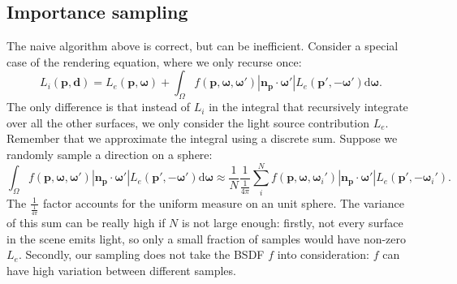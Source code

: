\documentclass{article}
\begin{document}
\subsection{Importance sampling}
The naive algorithm above is correct, but can be inefficient. Consider a special case of the rendering equation, where we only recurse once:
\begin{equation}
    L_i(\mathbf{p}, \mathbf{d}) = L_e(\mathbf{p}, \mathbf{\omega}) + \int_{\Omega} f(\mathbf{p}, \mathbf{\omega}, \mathbf{\omega}') |\mathbf{n}_{\mathbf{p}} \cdot \mathbf{\omega}'| L_e(\mathbf{p}', -\mathbf{\omega}') \mathrm{d} \mathbf{\omega}.
\end{equation}
The only difference is that instead of $L_i$ in the integral that recursively integrate over all the other surfaces, we only consider the light source contribution $L_e$. Remember that we approximate the integral using a discrete sum. Suppose we randomly sample a direction on a sphere:
\begin{equation}
  \int_{\Omega} f(\mathbf{p}, \mathbf{\omega}, \mathbf{\omega}') |\mathbf{n}_{\mathbf{p}} \cdot \mathbf{\omega}'| L_e(\mathbf{p}', -\mathbf{\omega}') \mathrm{d} \mathbf{\omega} \approx \frac{1}{N} \frac{1}{\frac{1}{4 \pi}} \sum_{i}^{N} f(\mathbf{p}, \mathbf{\omega}, \mathbf{\omega}_i') |\mathbf{n}_{\mathbf{p}} \cdot \mathbf{\omega}'| L_e(\mathbf{p}', -\mathbf{\omega}_i').
\end{equation}
The $\frac{1}{\frac{1}{4\pi}}$ factor accounts for the uniform measure on an unit sphere. The variance of this sum can be really high if $N$ is not large enough: firstly, not every surface in the scene emits light, so only a small fraction of samples would have non-zero $L_e$. Secondly, our sampling does not take the BSDF $f$ into consideration: $f$ can have high variation between different samples.
\end{document}
